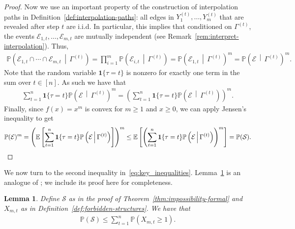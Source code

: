 \documentclass[11pt]{article}
\theoremstyle{plain}
\newtheorem{lemma}{Lemma}
\theoremstyle{definition}
\theoremstyle{remark}
\newcommand{\E}{\mathbb{E}}
\newcommand{\findOneLarge}{\mathcal{E}}
\newcommand{\findManyLarge}{\mathcal{S}}
\renewcommand{\Pr}{\mathbb{P}}
\begin{document}
\begin{proof}
    Now we use an important property of the construction of interpolation paths in Definition~\ref{def:interpolation-paths}: all edges in $Y_{1}^{(t)}, \ldots, Y_{m}^{(t)}$ that are revealed after step $t$ are i.i.d. 
    In particular, this implies that conditioned on $\Gamma^{(t)}$, the events $\findOneLarge_{1, t}, \ldots, \findOneLarge_{m, t}$ are mutually independent (see Remark~\ref{rem:interpret-interpolation}). 
    Thus, 
    \begin{align*}
        \Pr\left(\findOneLarge_{1,t} \cap \cdots \cap \findOneLarge_{m,t} \, \middle| \, \Gamma^{(t)}\right) 
        = \prod_{i = 1}^m \Pr\left(\findOneLarge_{i,t} \, \middle| \, \Gamma^{(t)}\right) 
        = \Pr\left(\findOneLarge_{1, t} \, \middle| \, \Gamma^{(t)}\right)^m 
        = \Pr\left(\findOneLarge \, \middle| \, \Gamma^{(t)}\right)^m.
    \end{align*}
    Note that the random variable $\mathbf{1}{\{\tau = t\}}$ is nonzero for exactly one term in the sum over $t \in [n]$. As such we have that
    \begin{align*}
        \sum_{t = 1}^n \mathbf{1}{\{\tau = t\}} \Pr\left(\findOneLarge \, \middle| \, \Gamma^{(t)}\right)^m 
        = \left(\sum_{t = 1}^n \mathbf{1}{\{\tau = t\}} \Pr\left(\findOneLarge \, \middle| \, \Gamma^{(t)}\right)\right)^m.
    \end{align*}
    Finally, since $f(x) = x^m$ is convex for $m \geq 1$ and $x \geq 0$, we can apply Jensen's inequality to get
    \begin{equation*}
        \Pr(\findOneLarge)^m 
        = \left( \E\left[\sum_{t = 1}^n \mathbf{1}{\{\tau = t\}}\Pr\left(\findOneLarge \, \middle| \, \Gamma^{(t)}\right)\right] \right)^m 
        \leq \E\left[\left(\sum_{t = 1}^n \mathbf{1}{\{\tau = t\}}\Pr\left(\findOneLarge \, \middle| \,  \Gamma^{(t)}\right)\right)^m\right] 
        = \Pr(\findManyLarge). \qedhere
    \end{equation*}
\end{proof}

We now turn to the second inequality in~\eqref{eq:key_inequalities}. 
Lemma~\ref{lem:S-above} is an analogue of \cite[Lemma~4.8]{GKW25}; we include its proof here for completeness.
\begin{lemma}\label{lem:S-above}
    Define $\findManyLarge$ as in the proof of Theorem~\ref{thm:impossibility-formal} and $X_{m,t}$ as in Definition~\ref{def:forbidden-structures}. We have that
    \begin{align*}
        \Pr(\findManyLarge) \leq \sum_{t = 1}^n \Pr(X_{m,t} \geq 1).
    \end{align*}
\end{lemma}
\end{document}
